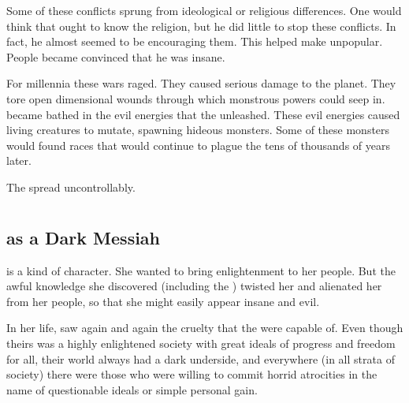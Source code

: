 Some of these conflicts sprung from ideological or religious differences. 
One would think that \Sethicus ought to know the  religion, but he did little to stop these conflicts. 
In fact, he almost seemed to be encouraging them. 
This helped make \Sethicus unpopular. 
People became convinced that he was insane.

For millennia these wars raged. 
They caused serious damage to the planet.
They tore open dimensional wounds through which monstrous powers could seep in. 
\Miith became bathed in the evil \xs energies that the \dragons unleashed. 
These evil energies caused living creatures to mutate, spawning hideous monsters. 
Some of these monsters would found races that would continue to plague the \wylde tens of thousands of years later.

The \wylde spread uncontrollably.















\section[Tyrasshana]{\Tiamat}









\subsection[Tyrasshana as a Dark Messiah]{\Tiamat{} as a Dark Messiah}
\Tiamat{} is a  kind of character. 
She wanted to bring enlightenment to her people. 
But the awful knowledge she discovered (including the ) twisted her and alienated her from her people, so that she might easily appear insane and evil. 

In her life, \Tiamat saw again and again the cruelty that the \caisith were capable of.
Even though theirs was a highly enlightened society with great ideals of progress and freedom for all, their world always had a dark underside, and everywhere (in all strata of society) there were those who were willing to commit horrid atrocities in the name of questionable ideals or simple personal gain. 

